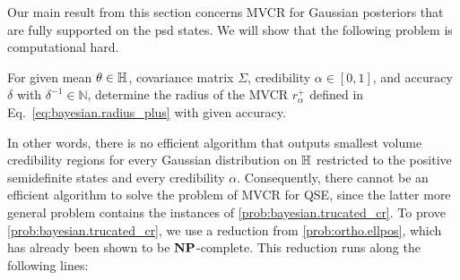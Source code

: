 Our main result from this section concerns MVCR for Gaussian posteriors that are fully supported on the psd states.
We will show that the following problem is computational hard.
\begin{problem}\label{prob:bayesian.trucated_cr}
  For given mean $\theta \in \mathbb{H}$, covariance matrix $\Sigma$, credibility $\alpha \in [0,1]$, and accuracy $\delta$ with $\delta^{-1} \in \mathbb{N}$, determine the radius of the MVCR $r^+_{\alpha}$ defined in Eq.~\eqref{eq:bayesian.radius_plus} with given accuracy.
\end{problem}
In other words, there is no efficient algorithm that outputs smallest volume credibility regions for every Gaussian distribution on $\mathbb{H}$ restricted to the positive semidefinite states and every credibility $\alpha$.
Consequently, there cannot be an efficient algorithm to solve the problem of MVCR for QSE, since the latter more general problem contains the instances of \cref{prob:bayesian.trucated_cr}.
To prove \cref{prob:bayesian.trucated_cr}, we use a reduction from \cref{prob:ortho.ellpos}, which has already been shown to be $\mathbf{NP}$-complete.
This reduction runs along the following lines:
